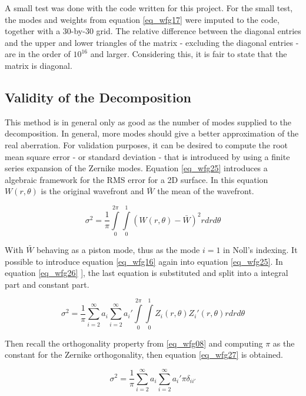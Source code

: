\documentclass{article}
\begin{document}
A small test was done with the code written for this project. For the small test, the modes and weights from equation \ref{eq_wfg17} were imputed to the code, together with a 30-by-30 grid. The relative difference between the diagonal entries and the upper and lower triangles of the matrix - excluding the diagonal entries - are in the order of $10^{16}$ and larger. Considering this, it is fair to state that the matrix is diagonal.

\newpage
\subsection{Validity of the Decomposition}
This method is in general only as good as the number of modes supplied to the decomposition. In general, more modes should give a better approximation of the real aberration. For validation purposes, it can be desired to compute the root mean square error - or standard deviation - that is introduced by using a finite series expansion of the Zernike modes. Equation \ref{eq_wfg25} \cite{zernikeMatlab} introduces  a algebraic framework for the RMS error for a 2D surface. In this equation $W(r,\theta)$ is the original wavefront and $\bar{W}$ the mean of the wavefront.

\begin{equation}
\sigma^2 = \frac{1}{\pi} \int \limits_0^{2 \pi} \int \limits_0^1 \left(W(r,\theta) - \bar{W} \right)^2 r dr d\theta
\label{eq_wfg25}
\end{equation}

With $\bar{W}$ behaving as a piston mode, thus as the mode $i = 1$ in Noll's indexing. It possible to introduce equation \ref{eq_wfg16} again into equation \ref{eq_wfg25}. In equation \ref{eq_wfg26} ], the last equation is substituted and split into a integral part and constant part.

\begin{equation}
\sigma^2 = \frac{1}{\pi} \sum \limits_{i=2}^{\infty} a_i \sum \limits_{i=2}^{\infty} a_i' \int \limits_0^{2 \pi} \int \limits_0^1 Z_i(r,\theta) Z_i'(r,\theta) r dr d\theta
\label{eq_wfg26}
\end{equation}

Then recall the orthogonality property from \ref{eq_wfg08} and computing $\pi$ as the constant for the Zernike orthogonality, then equation \ref{eq_wfg27} is obtained.

\begin{equation}
\sigma^2 = \frac{1}{\pi} \sum \limits_{i=2}^{\infty} a_i \sum \limits_{i=2}^{\infty} a_i' \pi \delta_{ii'}
\label{eq_wfg27}
\end{equation}
\end{document}
